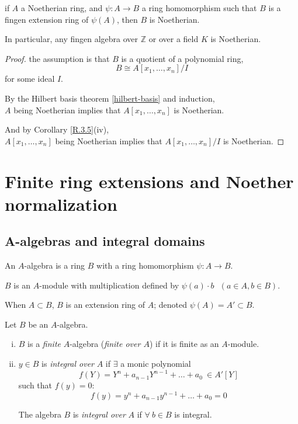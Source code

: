 \documentclass{article}
\theoremstyle{definition}
\newenvironment{defn}[1]
{\renewcommand\theinnerdefn{#1}\innerdefn}
{\endinnerdefn}
\newenvironment{cor}[1]
{\renewcommand\theinnercor{#1}\innercor}
{\endinnercor}
\begin{document}
\vspace{0.5cm}
\begin{cor}{R.3.6.C}
  if $A$ a Noetherian ring, and $\psi: A \longrightarrow B$ a ring homomorphism such that $B$ is a fingen extension ring of $\psi(A)$, then $B$ is Noetherian.

  In particular, any fingen algebra over $\mathbb{Z}$ or over a field $K$ is Noetherian.
\end{cor}
\begin{proof}
  the assumption is that $B$ is a quotient of a polynomial ring,
  $$B \cong A[x_1, \ldots, x_n] / I$$
  for some ideal $I$.

  By the Hilbert basis theorem \ref{hilbert-basis} and induction,\\
  $A$ being Noetherian implies that $A[x_1, \ldots, x_n]$ is Noetherian.

  And by Corollary \ref{R.3.5}(iv),\\
  $A[x_1, \ldots, x_n]$ being Noetherian implies that $A[x_1, \ldots, x_n]/I$ is Noetherian.
\end{proof}



\vspace{1cm}
\section{Finite ring extensions and Noether normalization}

\subsection{A-algebras and integral domains}

\begin{defn}{}[A-algebra / k-algebra]
  An $A$-algebra is a ring $B$ with a ring homomorphism $\psi: A \longrightarrow B$.

  $B$ is an $A$-module with multiplication defined by $\psi(a) \cdot b~~~ (a \in A, b \in B)$.

  When $A \subset B$, $B$ is an extension ring of $A$; denoted $\psi(A) = A' \subset B$.
\end{defn}

\begin{defn}{R.4.1}\label{R.4.1}
  Let $B$ be an $A$-algebra.

  \begin{enumerate}[i.]
    \item $B$ is a \emph{finite} $A$-algebra (\emph{finite over $A$}) if it is finite as an $A$-module.
    \item $y \in B$ is \emph{integral over} $A$ if $\exists$ a monic polynomial
      $$f(Y) = Y^n + a_{n-1} Y^{n-1} + \ldots + a_0 ~\in A'[Y]$$
      such that $f(y)=0:$
      $$f(y) = y^n + a_{n-1} y^{n-1} + \ldots + a_0 = 0$$

      The algebra $B$ is \emph{integral over} $A$ if $\forall~ b \in B$ is integral.
  \end{enumerate}
\end{defn}
\end{document}
